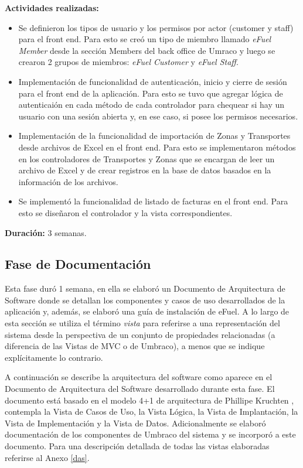 \vspace{0.3cm}
\textbf{Actividades realizadas:}
\begin{itemize}
    \item Se definieron los tipos de usuario y los permisos por actor (customer y staff) para el front end. Para esto se creó un tipo de miembro llamado \emph{eFuel Member} desde la sección Members del back office de Umraco y luego se crearon 2 grupos de miembros: \emph{eFuel Customer} y \emph{eFuel Staff}.
    \item Implementación de funcionalidad de autenticación, inicio y cierre de sesión para el front end de la aplicación. Para esto se tuvo que agregar lógica de autenticaión en cada método de cada controlador para chequear si hay un usuario con una sesión abierta y, en ese caso, si posee los permisos necesarios.
    \item Implementación de la funcionalidad de importación de Zonas y Transportes desde archivos de Excel en el front end. Para esto se implementaron métodos en los controladores de Transportes y Zonas que se encargan de leer un archivo de Excel y de crear registros en la base de datos basados en la información de los archivos.
    \item Se implementó la funcionalidad de listado de facturas en el front end. Para esto se diseñaron el controlador y la vista correspondientes.
\end{itemize}

\textbf{Duración:} 3 semanas.

\subsection{Fase de Documentación} \label{documentation}
Esta fase duró 1 semana, en ella se elaboró un Documento de Arquitectura de Software donde se detallan los componentes y casos de uso desarrollados de la aplicación y, además, se elaboró una guía de instalación de eFuel. A lo largo de esta sección se utiliza el término \emph{vista} para referirse a una representación del sistema desde la perspectiva de un conjunto de propiedades relacionadas (a diferencia de las Vistas de MVC o de Umbraco), a menos que se indique explícitamente lo contrario.

A continuación se describe la arquitectura del software como aparece en el Documento de Arquitectura del Software desarrollado durante esta fase. El documento está basado en el modelo 4+1 de arquitectura de Phillipe Kruchten \cite{41Kruchten}, contempla la Vista de Casos de Uso, la Vista Lógica, la Vista de Implantación, la Vista de Implementación y la Vista de Datos. Adicionalmente se elaboró documentación de los componentes de Umbraco del sistema y se incorporó a este documento. Para una descripción detallada de todas las vistas elaboradas referirse al Anexo \ref{das}.


